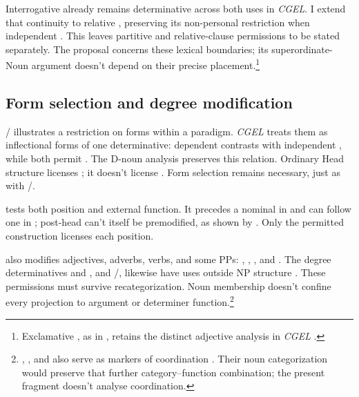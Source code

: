\documentclass[12pt]{article}
\begin{document}
Interrogative  already remains determinative across both uses in \textit{CGEL}. I extend that continuity to relative , preserving its non-personal restriction when independent \citep[397--399]{huddleston2002}. This leaves partitive and relative-clause permissions to be stated separately. The proposal concerns these lexical boundaries; its superordinate-Noun argument doesn't depend on their precise placement.\footnote{Exclamative , as in , retains the distinct adjective analysis in \textit{CGEL} \citep[436--437]{huddleston2002}.}

\subsection{Form selection and degree modification}\label{sec:enough}

/ illustrates a restriction on forms within a paradigm. \textit{CGEL} treats them as inflectional forms of one determinative: dependent  contrasts with independent , while both permit  \citep[389--390]{huddleston2002}. The D-noun analysis preserves this relation. Ordinary Head structure licenses ; it doesn't license . Form selection remains necessary, just as with /.

 tests both position and external function. It precedes a nominal in  and can follow one in ; post-head  can't itself be premodified, as shown by  \citep[396--397, 445]{huddleston2002}. Only the permitted construction licenses each position.

 also modifies adjectives, adverbs, verbs, and some PPs: , , , and  \citep[396--397]{huddleston2002}. The degree determinatives  and , and /, likewise have uses outside NP structure \citep[390, 395--397]{huddleston2002}. These permissions must survive recategorization. Noun membership doesn't confine every projection to argument or determiner function.\footnote{, , and  also serve as markers of coordination \citep[1305, 1308]{huddleston2002}. Their noun categorization would preserve that further category--function combination; the present fragment doesn't analyse coordination.}
\end{document}
